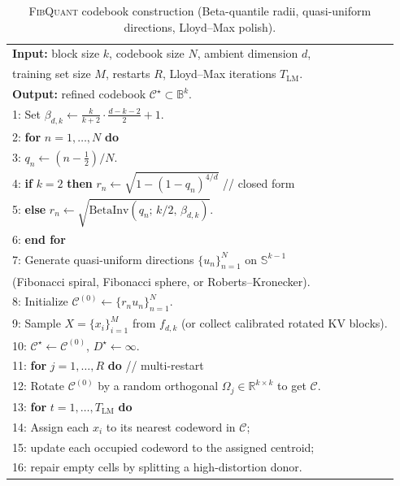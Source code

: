 \documentclass{article}
\theoremstyle{definition}
\theoremstyle{remark}
\newcommand{\bbR}{\mathbb{R}}
\newcommand{\bbS}{\mathbb{S}}
\newcommand{\bbB}{\mathbb{B}}
\newcommand{\half}{\tfrac{1}{2}}
\begin{document}
\begin{table}[h]
\caption{\textsc{FibQuant} codebook construction (Beta-quantile
radii, quasi-uniform directions, Lloyd--Max polish).}
\label{alg:codebook}
\begin{center}\small
\begin{tabular}{l}
\toprule
\textbf{Input:} block size $k$, codebook size $N$, ambient
dimension $d$, \\
\quad training set size $M$, restarts $R$, Lloyd--Max iterations
$T_{\mathrm{LM}}$. \\
\textbf{Output:} refined codebook
$\mathcal{C}^\star \subset \bbB^k$. \\
\midrule
1: Set $\beta_{d, k} \leftarrow \tfrac{k}{k + 2}\cdot\tfrac{d - k - 2}{2} + 1$. \\
2: \textbf{for} $n = 1, \ldots, N$ \textbf{do} \\
3: \quad $q_n \leftarrow (n - \half)/N$. \\
4: \quad \textbf{if} $k = 2$ \textbf{then}
$r_n \leftarrow \sqrt{1 - (1 - q_n)^{4/d}}$ \quad // closed form \\
5: \quad \textbf{else}
$r_n \leftarrow \sqrt{\mathrm{BetaInv}(q_n;\,k/2,\,\beta_{d, k})}$. \\
6: \textbf{end for} \\
7: Generate quasi-uniform directions $\{u_n\}_{n = 1}^{N}$ on
$\bbS^{k - 1}$ \\
\quad (Fibonacci spiral, Fibonacci sphere, or Roberts--Kronecker). \\
8: Initialize $\mathcal{C}^{(0)} \leftarrow \{r_n u_n\}_{n = 1}^{N}$. \\
9: Sample $X = \{x_i\}_{i = 1}^{M}$ from $f_{d, k}$ (or collect
calibrated rotated KV blocks). \\
10: $\mathcal{C}^\star \leftarrow \mathcal{C}^{(0)}$,
$D^\star \leftarrow \infty$. \\
11: \textbf{for} $j = 1, \ldots, R$ \textbf{do} \quad // multi-restart \\
12: \quad Rotate $\mathcal{C}^{(0)}$ by a random orthogonal
$\Omega_j \in \bbR^{k \times k}$ to get $\mathcal{C}$. \\
13: \quad \textbf{for} $t = 1, \ldots, T_{\mathrm{LM}}$ \textbf{do} \\
14: \qquad Assign each $x_i$ to its nearest codeword in $\mathcal{C}$; \\
15: \qquad update each occupied codeword to the assigned centroid; \\
16: \qquad repair empty cells by splitting a high-distortion donor. \\

\end{tabular}
\end{center}
\end{table}
\end{document}
